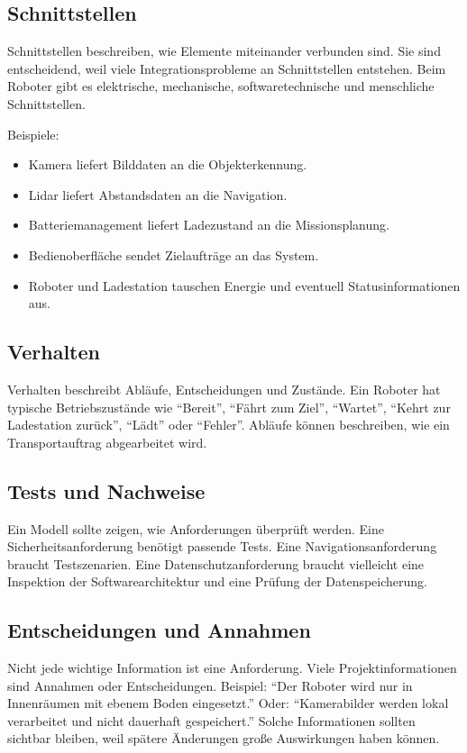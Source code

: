 \subsection{Schnittstellen}
Schnittstellen beschreiben, wie Elemente miteinander verbunden sind. Sie sind entscheidend, weil viele Integrationsprobleme an Schnittstellen entstehen. Beim Roboter gibt es elektrische, mechanische, softwaretechnische und menschliche Schnittstellen.

Beispiele:

\begin{itemize}
    \item Kamera liefert Bilddaten an die Objekterkennung.
    \item Lidar liefert Abstandsdaten an die Navigation.
    \item Batteriemanagement liefert Ladezustand an die Missionsplanung.
    \item Bedienoberfläche sendet Zielaufträge an das System.
    \item Roboter und Ladestation tauschen Energie und eventuell Statusinformationen aus.
\end{itemize}

\subsection{Verhalten}
Verhalten beschreibt Abläufe, Entscheidungen und Zustände. Ein Roboter hat typische Betriebszustände wie \enquote{Bereit}, \enquote{Fährt zum Ziel}, \enquote{Wartet}, \enquote{Kehrt zur Ladestation zurück}, \enquote{Lädt} oder \enquote{Fehler}. Abläufe können beschreiben, wie ein Transportauftrag abgearbeitet wird.

\subsection{Tests und Nachweise}
Ein Modell sollte zeigen, wie Anforderungen überprüft werden. Eine Sicherheitsanforderung benötigt passende Tests. Eine Navigationsanforderung braucht Testszenarien. Eine Datenschutzanforderung braucht vielleicht eine Inspektion der Softwarearchitektur und eine Prüfung der Datenspeicherung.

\subsection{Entscheidungen und Annahmen}
Nicht jede wichtige Information ist eine Anforderung. Viele Projektinformationen sind Annahmen oder Entscheidungen. Beispiel: \enquote{Der Roboter wird nur in Innenräumen mit ebenem Boden eingesetzt.} Oder: \enquote{Kamerabilder werden lokal verarbeitet und nicht dauerhaft gespeichert.} Solche Informationen sollten sichtbar bleiben, weil spätere Änderungen große Auswirkungen haben können.

